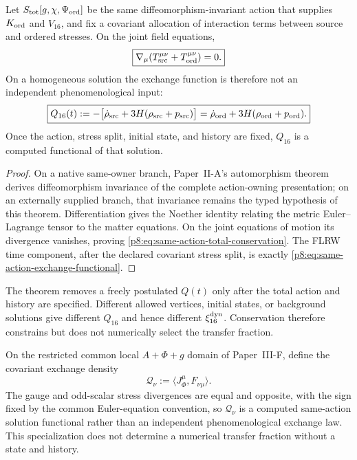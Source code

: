 \documentclass[12pt,a4paper]{article}
\begin{document}
\begin{theorem}
\label{p8:thm:same-action-exchange-current}
Let \(S_{\rm tot}[g,\chi,\Psi_{\rm ord}]\) be the same diffeomorphism-invariant
action that supplies \(K_{\rm ord}\) and \(V_{16}\), and fix a covariant
allocation of interaction terms between source and ordered stresses.  On the
joint field equations,
\begin{equation}
\label{p8:eq:same-action-total-conservation}
 \boxed{\nabla_\mu\!\left(
 T_{\rm src}^{\mu\nu}+T_{\rm ord}^{\mu\nu}\right)=0.}
\end{equation}
On a homogeneous solution the exchange function is therefore not an
independent phenomenological input:
\begin{equation}
\label{p8:eq:same-action-exchange-functional}
 \boxed{
 Q_{16}(t)
 :=-\bigl[\dot\rho_{\rm src}+3H(\rho_{\rm src}+p_{\rm src})\bigr]
 =\dot\rho_{\rm ord}+3H(\rho_{\rm ord}+p_{\rm ord}).}
\end{equation}
Once the action, stress split, initial state, and history are fixed,
\(Q_{16}\) is a computed functional of that solution.
\end{theorem}

\begin{proof}
On a native same-owner branch, Paper~II-A's automorphism theorem derives
diffeomorphism invariance of the complete action-owning presentation; on an
externally supplied branch, that invariance remains the typed hypothesis of
this theorem.  Differentiation gives the Noether identity relating the metric
Euler--Lagrange tensor to the matter equations.
On the joint equations of motion its divergence vanishes, proving
\eqref{p8:eq:same-action-total-conservation}.  The FLRW time component,
after the declared covariant stress split, is exactly
\eqref{p8:eq:same-action-exchange-functional}.
\end{proof}

\begin{remark}
The theorem removes a freely postulated \(Q(t)\) only after the total action
and history are specified.  Different allowed vertices, initial states, or
background solutions give different \(Q_{16}\) and hence different
\(\xi_{16}^{\rm dyn}\).  Conservation therefore constrains but does not
numerically select the transfer fraction.
\end{remark}



\begin{corollary}
\label{p8:cor:v176-local-gauge-scalar-exchange}
On the restricted common local \(A+\Phi+g\) domain of Paper~III-F, define the
covariant exchange density
\[
 \mathcal Q_\nu:=\langle J_\Phi^\mu,F_{\nu\mu}\rangle.
\]
The gauge and odd-scalar stress divergences are equal and opposite, with the
sign fixed by the common Euler-equation convention, so \(\mathcal Q_\nu\) is
a computed same-action solution functional rather than an independent
phenomenological exchange law.  This specialization does not determine a
numerical transfer fraction without a state and history.
\end{corollary}
\end{document}

